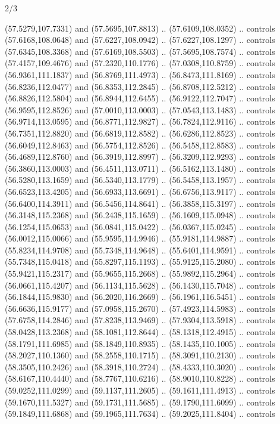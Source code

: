 \begin{flagdescription}{2/3}
\begin{scope}[shift={(0.5\flaglength,0.5)},scale=\flagwidth/320]
\begin{scope}[y=0.8pt, x=0.8pt, yscale=-1,shift={(-118.3,-146)}]
  (57.5279,107.7331) and (57.5695,107.8813) .. (57.6109,108.0352) .. controls
  (57.6168,108.0648) and (57.6227,108.0942) .. (57.6227,108.1297) .. controls
  (57.6345,108.3368) and (57.6169,108.5503) .. (57.5695,108.7574) .. controls
  (57.4157,109.4676) and (57.2320,110.1776) .. (57.0308,110.8759) .. controls
  (56.9361,111.1837) and (56.8769,111.4973) .. (56.8473,111.8169) .. controls
  (56.8236,112.0477) and (56.8353,112.2845) .. (56.8708,112.5212) .. controls
  (56.8826,112.5804) and (56.8944,112.6455) .. (56.9122,112.7047) .. controls
  (56.9595,112.8526) and (57.0010,113.0003) .. (57.0543,113.1483) .. controls
  (56.9714,113.0595) and (56.8771,112.9827) .. (56.7824,112.9116) .. controls
  (56.7351,112.8820) and (56.6819,112.8582) .. (56.6286,112.8523) .. controls
  (56.6049,112.8463) and (56.5754,112.8526) .. (56.5458,112.8583) .. controls
  (56.4689,112.8760) and (56.3919,112.8997) .. (56.3209,112.9293) .. controls
  (56.3860,113.0003) and (56.4511,113.0711) .. (56.5162,113.1480) .. controls
  (56.5280,113.1659) and (56.5340,113.1779) .. (56.5458,113.1957) .. controls
  (56.6523,113.4205) and (56.6933,113.6691) .. (56.6756,113.9117) .. controls
  (56.6400,114.3911) and (56.5456,114.8641) .. (56.3858,115.3197) .. controls
  (56.3148,115.2368) and (56.2438,115.1659) .. (56.1609,115.0948) .. controls
  (56.1254,115.0653) and (56.0841,115.0422) .. (56.0367,115.0245) .. controls
  (56.0012,115.0066) and (55.9595,114.9946) .. (55.9181,114.9887) .. controls
  (55.8234,114.9708) and (55.7348,114.9648) .. (55.6401,114.9591) .. controls
  (55.7348,115.0418) and (55.8297,115.1193) .. (55.9125,115.2080) .. controls
  (55.9421,115.2317) and (55.9655,115.2668) .. (55.9892,115.2964) .. controls
  (56.0661,115.4207) and (56.1134,115.5628) .. (56.1430,115.7048) .. controls
  (56.1844,115.9830) and (56.2020,116.2669) .. (56.1961,116.5451) .. controls
  (56.6636,115.9177) and (57.0958,115.2670) .. (57.4923,114.5983) .. controls
  (57.6758,114.2846) and (57.8238,113.9469) .. (57.9304,113.5918) .. controls
  (58.0428,113.2368) and (58.1081,112.8644) .. (58.1318,112.4915) .. controls
  (58.1791,111.6985) and (58.1849,110.8935) .. (58.1435,110.1005) .. controls
  (58.2027,110.1360) and (58.2558,110.1715) .. (58.3091,110.2130) .. controls
  (58.3505,110.2426) and (58.3918,110.2724) .. (58.4333,110.3020) .. controls
  (58.6167,110.4440) and (58.7767,110.6216) .. (58.9010,110.8228) .. controls
  (59.0252,111.0299) and (59.1137,111.2605) .. (59.1611,111.4913) .. controls
  (59.1670,111.5327) and (59.1731,111.5685) .. (59.1790,111.6099) .. controls
  (59.1849,111.6868) and (59.1965,111.7634) .. (59.2025,111.8404) .. controls

\end{scope}
\end{scope}
\end{flagdescription}
